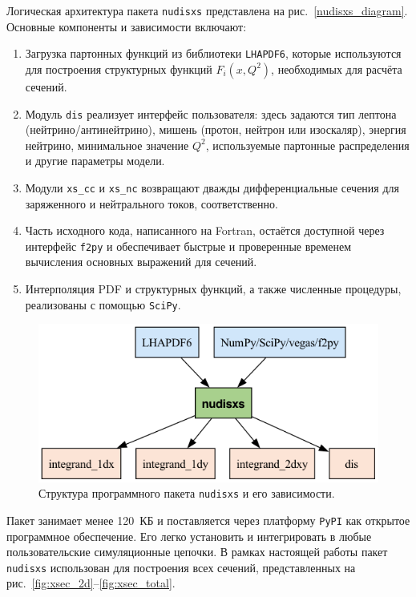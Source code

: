 Логическая архитектура пакета \texttt{nudisxs} представлена на рис.~\ref{nudisxs_diagram}. Основные компоненты и зависимости включают:

\begin{enumerate}
    \item Загрузка партонных функций из библиотеки \texttt{LHAPDF6}, которые используются для построения структурных функций $F_i(x, Q^2)$, необходимых для расчёта сечений.
    
    \item Модуль \texttt{dis} реализует интерфейс пользователя: здесь задаются тип лептона (нейтрино/антинейтрино), мишень (протон, нейтрон или изоскаляр), энергия нейтрино, минимальное значение $Q^2$, используемые партонные распределения и другие параметры модели.
    
    \item Модули \texttt{xs\_cc} и \texttt{xs\_nc} возвращают дважды дифференциальные сечения для заряженного и нейтрального токов, соответственно. 
    
    \item Часть исходного кода, написанного на Fortran, остаётся доступной через интерфейс \texttt{f2py} и обеспечивает быстрые и проверенные временем вычисления основных выражений для сечений.
    
    \item Интерполяция PDF и структурных функций, а также численные процедуры, реализованы с помощью \texttt{SciPy}.
\end{enumerate}

\begin{figure}[!h]
\centering
\includegraphics[width=\linewidth]{images/nudisxs_diagram.png}
\caption{Структура программного пакета \texttt{nudisxs} и его зависимости.}
\label{fig:nudisxs1}
\end{figure}

Пакет занимает менее 120~КБ и поставляется через платформу \texttt{PyPI} как открытое программное обеспечение. Его легко установить и интегрировать в любые пользовательские симуляционные цепочки. В рамках настоящей работы пакет \texttt{nudisxs} использован для построения всех сечений, представленных на рис.~\ref{fig:xsec_2d}–\ref{fig:xsec_total}.


